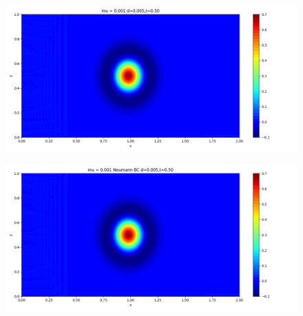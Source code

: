 \documentclass[12pt]{article}
\begin{document}
\begin{figure}[H]
\begin{minipage}{\linewidth}
    \begin{minipage}{0.5\textwidth}
    \includegraphics[width=\linewidth]{figuresmu/mu3d0.005t0.50.png}
    \label{fig3}
    \end{minipage}\hfill
    \begin{minipage}{0.5\textwidth}
    \includegraphics[width=\linewidth]{figuresmu/mu3Nud0.005t0.50.png}
    \label{fig4}
    \end{minipage}
    \vspace{-1.5em}
    

\end{minipage}
\end{figure}
\end{document}
